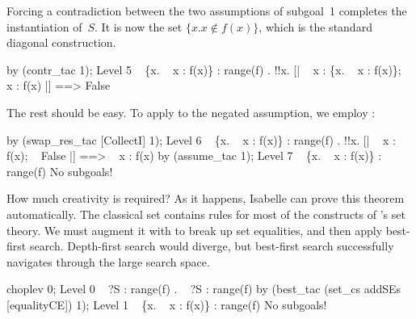 Forcing a contradiction between the two assumptions of subgoal~1 completes
the instantiation of~$S$.  It is now the set $\{x. x\not\in f(x)\}$, which
is the standard diagonal construction.
\begin{ttbox}
by (contr_tac 1);
{\out Level 5}
{\out ~ \{x. ~ x : f(x)\} : range(f)}
{. !!x. [| ~ x : \{x. ~ x : f(x)\}; ~ x : f(x) |] ==> False}
\end{ttbox}
The rest should be easy.  To apply  to the negated
assumption, we employ :
\begin{ttbox}
by (swap_res_tac [CollectI] 1);
{\out Level 6}
{\out ~ \{x. ~ x : f(x)\} : range(f)}
{. !!x. [| ~ x : f(x); ~ False |] ==> ~ x : f(x)}
\ttbreak
by (assume_tac 1);
{\out Level 7}
{\out ~ \{x. ~ x : f(x)\} : range(f)}
{\out No subgoals!}
\end{ttbox}
How much creativity is required?  As it happens, Isabelle can prove this
theorem automatically.  The classical set  contains rules
for most of the constructs of \HOL's set theory.  We must augment it with
 to break up set equalities, and then apply best-first
search.  Depth-first search would diverge, but best-first search
successfully navigates through the large search space.
\begin{ttbox}
choplev 0;
{\out Level 0}
{\out ~ ?S : range(f)}
{. ~ ?S : range(f)}
\ttbreak
by (best_tac (set_cs addSEs [equalityCE]) 1);
{\out Level 1}
{\out ~ \{x. ~ x : f(x)\} : range(f)}
{\out No subgoals!}
\end{ttbox}

